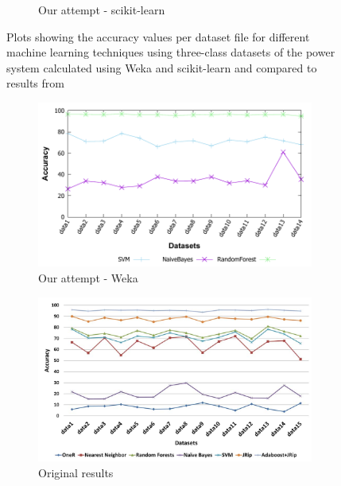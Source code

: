 \begin{figure}[H]
\begin{subfigure}[t]{110mm}
        \caption{Our attempt - scikit-learn}
    \end{subfigure}
    \caption{Plots showing the accuracy values per dataset file for different machine learning techniques using three-class datasets of the power system calculated using Weka and scikit-learn and compared to results from \cite{borges_hink_machine_2014-1}}
    \label{fig:weka_acc3}
\end{figure}

\begin{figure}[H]
    \centering
    \begin{subfigure}[t]{110mm}
        \includegraphics[width=\linewidth]{images/weka_accuracy2}
        \caption{Our attempt - Weka}
    \end{subfigure}
    \begin{subfigure}[t]{110mm}
        \includegraphics[width=\linewidth]{images/weka_accuracy2_cite.png}
        \caption{Original results \cite{borges_hink_machine_2014-1}}
    \end{subfigure}    
    \begin{subfigure}[t]{110mm}

\end{subfigure}
\end{figure}
